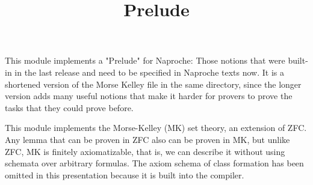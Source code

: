 \documentclass{article}
\title{Prelude}
\author{}
\date{}
\begin{document}

  \maketitle

  This module implements a "Prelude" for Naproche: Those notions that were built-in
  in the last release and need to be specified in Naproche texts now.
  It is a shortened version of the Morse Kelley file in the same directory,
  since the longer version adds many useful notions that make it harder
  for provers to prove the tasks that they could prove before.

  This module implements the Morse-Kelley (MK) set theory,
  an extension of ZFC. Any lemma that can be proven in ZFC
  also can be proven in MK, but unlike ZFC, MK is finitely axiomatizable,
  that is, we can describe it without using schemata over arbitrary formulas.
  The axiom schema of class formation has been omitted in this presentation
  because it is built into the compiler.
\end{document}
